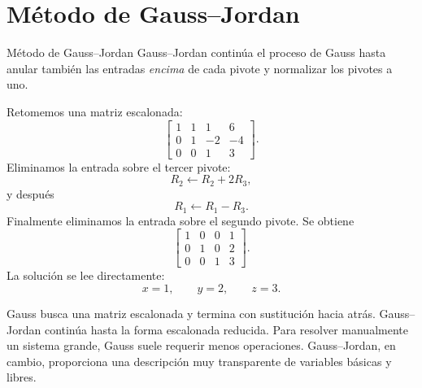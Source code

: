 \documentclass[aspectratio=169,9pt]{beamer}
\theoremstyle{remark}
\begin{document}
\section{Método de Gauss--Jordan}
\begin{frame}[allowframebreaks,t]{Método de Gauss--Jordan}
Gauss--Jordan continúa el proceso de Gauss hasta anular también las entradas \emph{encima} de cada
pivote y normalizar los pivotes a uno.

Retomemos una matriz escalonada:
\[
\left[
\begin{array}{ccc|c}
1&1&1&6\\
0&1&-2&-4\\
0&0&1&3
\end{array}
\right].
\]
Eliminamos la entrada sobre el tercer pivote:
\[
R_2\leftarrow R_2+2R_3,
\]
y después
\[
R_1\leftarrow R_1-R_3.
\]
Finalmente eliminamos la entrada sobre el segundo pivote. Se obtiene
\[
\left[
\begin{array}{ccc|c}
1&0&0&1\\
0&1&0&2\\
0&0&1&3
\end{array}
\right].
\]
La solución se lee directamente:
\[
x=1,\qquad y=2,\qquad z=3.
\]

\par{}\par\smallskip

Gauss busca una matriz escalonada y termina con sustitución hacia atrás. Gauss--Jordan continúa hasta
la forma escalonada reducida. Para resolver manualmente un sistema grande, Gauss suele requerir menos
operaciones. Gauss--Jordan, en cambio, proporciona una descripción muy transparente de variables
básicas y libres.
\end{frame}
\end{document}
